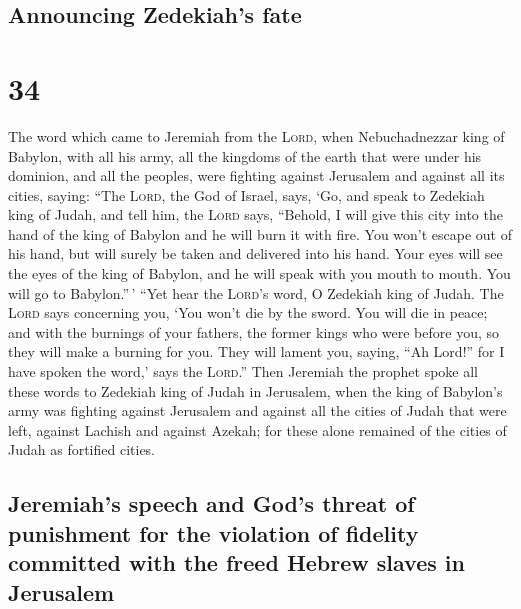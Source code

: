\hypertarget{announcing-zedekiahs-fate}{%
\subsection{Announcing Zedekiah's
fate}\label{announcing-zedekiahs-fate}}

\hypertarget{section-33}{%
\section{34}\label{section-33}}

 The word which came to Jeremiah from the \textsc{Lord},
when Nebuchadnezzar king of Babylon, with all his army, all the kingdoms
of the earth that were under his dominion, and all the peoples, were
fighting against Jerusalem and against all its cities, saying:
 ``The \textsc{Lord}, the God of Israel, says, `Go, and
speak to Zedekiah king of Judah, and tell him, the \textsc{Lord} says,
``Behold, I will give this city into the hand of the king of Babylon and
he will burn it with fire.  You won't escape out of his
hand, but will surely be taken and delivered into his hand. Your eyes
will see the eyes of the king of Babylon, and he will speak with you
mouth to mouth. You will go to Babylon.''\,'  ``Yet hear
the \textsc{Lord}'s word, O Zedekiah king of Judah. The \textsc{Lord}
says concerning you, `You won't die by the sword.  You
will die in peace; and with the burnings of your fathers, the former
kings who were before you, so they will make a burning for you. They
will lament you, saying, ``Ah Lord!'' for I have spoken the word,' says
the \textsc{Lord}.''  Then Jeremiah the prophet spoke all
these words to Zedekiah king of Judah in Jerusalem,  when
the king of Babylon's army was fighting against Jerusalem and against
all the cities of Judah that were left, against Lachish and against
Azekah; for these alone remained of the cities of Judah as fortified
cities.

\hypertarget{jeremiahs-speech-and-gods-threat-of-punishment-for-the-violation-of-fidelity-committed-with-the-freed-hebrew-slaves-in-jerusalem}{%
\subsection{Jeremiah's speech and God's threat of punishment for the
violation of fidelity committed with the freed Hebrew slaves in
Jerusalem}\label{jeremiahs-speech-and-gods-threat-of-punishment-for-the-violation-of-fidelity-committed-with-the-freed-hebrew-slaves-in-jerusalem}}

